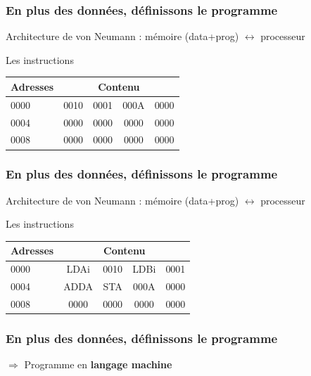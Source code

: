 \documentclass{beamer}
\begin{document}
\begin{frame}
\frametitle{En plus des données, définissons le programme}
Architecture de von Neumann : mémoire (data+prog) $\leftrightarrow$ processeur 
\begin{block}{Les instructions}
\centering\begin{tabular}{l|cccc}
Adresses & \multicolumn{4}{c}{Contenu}\\
\hline
0000 & 0010 & 0001 & 000A & 0000\\
0004 & 0000 & 0000 & 0000 & 0000\\
0008 & 0000 & 0000 & 0000 & 0000
\end{tabular}
\end{block}
\end{frame}

\begin{frame}
\frametitle{En plus des données, définissons le programme}
Architecture de von Neumann : mémoire (data+prog) $\leftrightarrow$ processeur 
\begin{block}{Les instructions}

\centering\begin{tabular}{l|cccc}
Adresses & \multicolumn{4}{c}{Contenu}\\
\hline
0000 & LDAi & 0010 & LDBi & 0001 \\
0004 & ADDA & STA & 000A & 0000\\
0008 & 0000 & 0000 & 0000 & 0000
\end{tabular}
\end{block}
\end{frame}

\begin{frame}
\frametitle{En plus des données, définissons le programme}

$\Rightarrow$ Programme en \textbf{langage machine}
\end{frame}
\end{document}
